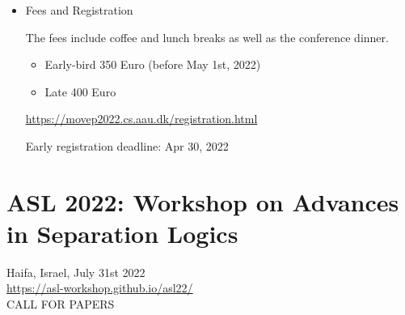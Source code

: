 \documentclass[prodmode,acmtecs]{acmsmall} %
\begin{document}
\begin{itemize}
  We encourage participants to present their (ongoing or published) work. Talks will last around 20 minutes. 1-2 page abstracts (no particular format is required) should be submitted via easychair: 
 
  \href{https://easychair.org/conferences/?conf=movep2022}{https://easychair.org/conferences/?conf=movep2022} 
 
\begin{itemize}\item  Important Dates
\end{itemize} 
\begin{tabulary}{\linewidth}{LL}Sudent Abstract submission:  & May 01, 2022 \\
Notification of acceptance:  & May 14, 2022 \\
\end{tabulary}
 
\item  Fees and Registration 
 
  The fees include coffee and lunch breaks as well as the conference dinner. 
 
\begin{itemize}\item  Early-bird 350 Euro (before May 1st, 2022)
\item  Late 400 Euro
\end{itemize} 
  \href{https://movep2022.cs.aau.dk/registration.html}{https://movep2022.cs.aau.dk/registration.html} 
 
Early registration deadline: Apr 30, 2022 
 
\end{itemize}\section{ASL 2022: Workshop on Advances in Separation Logics}\label{ASL2022}  Haifa, Israel, July 31st 2022\\ 
  \href{https://asl-workshop.github.io/asl22/}{https://asl-workshop.github.io/asl22/}\\ 
CALL FOR PAPERS 
\end{document}
